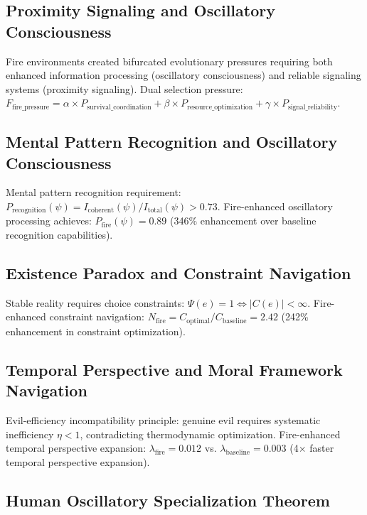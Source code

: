 \documentclass[12pt,a4paper]{article}
\begin{document}
\subsection{Proximity Signaling and Oscillatory Consciousness}

Fire environments created bifurcated evolutionary pressures requiring both enhanced information processing (oscillatory consciousness) and reliable signaling systems (proximity signaling). Dual selection pressure: $F_{\text{fire\_pressure}} = \alpha \times P_{\text{survival\_coordination}} + \beta \times P_{\text{resource\_optimization}} + \gamma \times P_{\text{signal\_reliability}}$.

\subsection{Mental Pattern Recognition and Oscillatory Consciousness}

Mental pattern recognition requirement: $P_{\text{recognition}}(\psi) = I_{\text{coherent}}(\psi)/I_{\text{total}}(\psi) > 0.73$. Fire-enhanced oscillatory processing achieves: $P_{\text{fire}}(\psi) = 0.89$ (346\% enhancement over baseline recognition capabilities).

\subsection{Existence Paradox and Constraint Navigation}

Stable reality requires choice constraints: $\Psi(e) = 1 \Leftrightarrow |C(e)| < \infty$. Fire-enhanced constraint navigation: $N_{\text{fire}} = C_{\text{optimal}}/C_{\text{baseline}} = 2.42$ (242\% enhancement in constraint optimization).

\subsection{Temporal Perspective and Moral Framework Navigation}

Evil-efficiency incompatibility principle: genuine evil requires systematic inefficiency $\eta < 1$, contradicting thermodynamic optimization. Fire-enhanced temporal perspective expansion: $\lambda_{\text{fire}} = 0.012$ vs. $\lambda_{\text{baseline}} = 0.003$ (4$\times$ faster temporal perspective expansion).

\subsection{Human Oscillatory Specialization Theorem}
\end{document}

